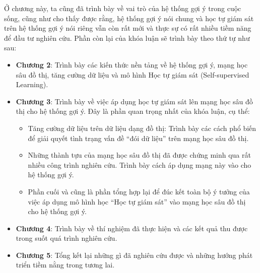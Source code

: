 \noindent Ở chương này, ta cũng đã trình bày về vai trò của hệ thống gợi ý trong cuộc sống, cũng như cho thấy được rằng, hệ thống gợi ý nói chung và học tự giám sát trên hệ thống gợi ý nói riêng vẫn còn rất mới và thực sự có rất nhiều tiềm năng để đầu tư nghiên cứu. Phần còn lại của khóa luận sẽ trình bày theo thứ tự như sau:
\begin{itemize}
    \item[] \textbf{Chương 2}: Trình bày các kiến thức nền tảng về hệ thống gợi ý, mạng học sâu đồ thị, tăng cường dữ liệu và mô hình Học tự giám sát (Self-supervised Learning).
    
    \item[] \textbf{Chương 3}: Trình bày về việc áp dụng học tự giám sát lên mạng học sâu đồ thị cho hệ thống gợi ý. Đây là phần quan trọng nhất của khóa luận, cụ thể:
        \begin{itemize}
            \item Tăng cường dữ liệu trên dữ liệu dạng đồ thị: Trình bày các cách phổ biến để giải quyết tình trạng vấn đề ``đói dữ liệu'' trên mạng học sâu đồ thị.

            \item Những thành tựu của mạng học sâu đồ thị đã được chứng minh qua rất nhiều công trình nghiên cứu. Trình bày cách áp dụng mạng này vào cho hệ thống gợi ý.
            
            \item Phần cuối và cũng là phần tổng hợp lại để đúc kết toàn bộ ý tưởng của việc áp dụng mô hình học ``Học tự giám sát'' vào mạng học sâu đồ thị cho hệ thống gợi ý. 
        \end{itemize}
    
    \item[] \textbf{Chương 4}: Trình bày về thí nghiệm đã thực hiện và các kết quả thu được trong suốt quá trình nghiên cứu.
    
    \item[] \textbf{Chương 5}: Tổng kết lại những gì đã nghiên cứu được và những hướng phát triển tiềm nằng trong tương lai.
\end{itemize}
